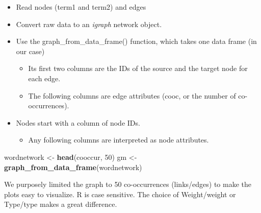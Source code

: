 \documentclass[
]{article}
\newenvironment{Shaded}{\begin{snugshade}}{\end{snugshade}}
\newcommand{\DecValTok}[1]{\textcolor[rgb]{0.00,0.00,0.81}{#1}}
\newcommand{\FunctionTok}[1]{\textcolor[rgb]{0.13,0.29,0.53}{\textbf{#1}}}
\newcommand{\NormalTok}[1]{#1}
\newcommand{\OtherTok}[1]{\textcolor[rgb]{0.56,0.35,0.01}{#1}}
\providecommand{\tightlist}{%
  \setlength{\itemsep}{0pt}\setlength{\parskip}{0pt}}
\begin{document}
\begin{itemize}
\tightlist
\item
  Read nodes (term1 and term2) and edges
\item
  Convert raw data to an \emph{igraph} network object.
\item
  Use the graph\_from\_data\_frame() function, which takes one data frame (in our case)

  \begin{itemize}
  \tightlist
  \item
    Its first two columns are the IDs of the source and the target node for each edge.
  \item
    The following columns are edge attributes (cooc, or the number of co-occurrences).
  \end{itemize}
\item
  Nodes start with a column of node IDs.

  \begin{itemize}
  \tightlist
  \item
    Any following columns are interpreted as node attributes.
  \end{itemize}
\end{itemize}

\footnotesize

\begin{Shaded}
\begin{Highlighting}[]
\NormalTok{wordnetwork }\OtherTok{\textless{}{-}} \FunctionTok{head}\NormalTok{(cooccur, }\DecValTok{50}\NormalTok{)}
\NormalTok{gm }\OtherTok{\textless{}{-}} \FunctionTok{graph\_from\_data\_frame}\NormalTok{(wordnetwork)}
\end{Highlighting}
\end{Shaded}

\normalsize

We purposely limited the graph to 50 co-occurrences (links/edges) to make the plots easy to visualize. R is case sensitive. The choice of Weight/weight or Type/type makes a great difference.
\end{document}
